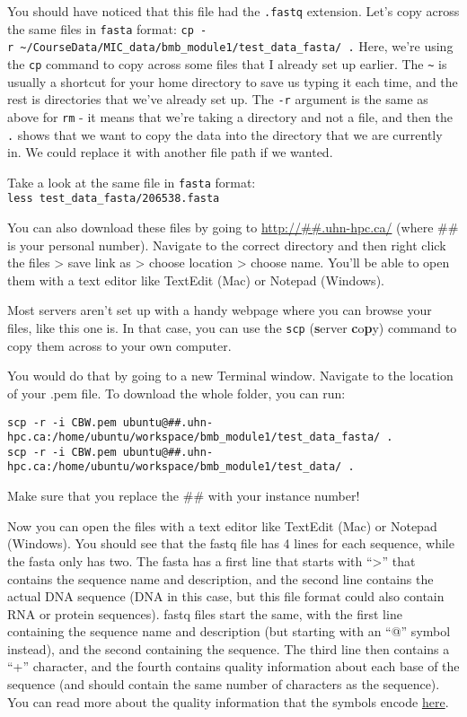 \documentclass[
]{book}
\begin{document}
You should have noticed that this file had the \texttt{.fastq} extension. Let's copy across the same files in \texttt{fasta} format: \texttt{cp\ -r\ \textasciitilde{}/CourseData/MIC\_data/bmb\_module1/test\_data\_fasta/\ .}
Here, we're using the \texttt{cp} command to copy across some files that I already set up earlier. The \texttt{\textasciitilde{}} is usually a shortcut for your home directory to save us typing it each time, and the rest is directories that we've already set up. The \texttt{-r} argument is the same as above for \texttt{rm} - it means that we're taking a directory and not a file, and then the \texttt{.} shows that we want to copy the data into the directory that we are currently in. We could replace it with another file path if we wanted.

Take a look at the same file in \texttt{fasta} format: \texttt{less\ test\_data\_fasta/206538.fasta}

You can also download these files by going to \url{http://\#\#.uhn-hpc.ca/} (where \#\# is your personal number). Navigate to the correct directory and then right click the files \textgreater{} save link as \textgreater{} choose location \textgreater{} choose name. You'll be able to open them with a text editor like TextEdit (Mac) or Notepad (Windows).

Most servers aren't set up with a handy webpage where you can browse your files, like this one is. In that case, you can use the \texttt{scp} (\textbf{s}erver \textbf{c}o\textbf{p}y) command to copy them across to your own computer.

You would do that by going to a new Terminal window. Navigate to the location of your .pem file. To download the whole folder, you can run:

\begin{verbatim}
scp -r -i CBW.pem ubuntu@##.uhn-hpc.ca:/home/ubuntu/workspace/bmb_module1/test_data_fasta/ .
scp -r -i CBW.pem ubuntu@##.uhn-hpc.ca:/home/ubuntu/workspace/bmb_module1/test_data/ .
\end{verbatim}

Make sure that you replace the \#\# with your instance number!

Now you can open the files with a text editor like TextEdit (Mac) or Notepad (Windows).
You should see that the fastq file has 4 lines for each sequence, while the fasta only has two. The fasta has a first line that starts with ``\textgreater{}'' that contains the sequence name and description, and the second line contains the actual DNA sequence (DNA in this case, but this file format could also contain RNA or protein sequences). fastq files start the same, with the first line containing the sequence name and description (but starting with an ``@'' symbol instead), and the second containing the sequence. The third line then contains a ``+'' character, and the fourth contains quality information about each base of the sequence (and should contain the same number of characters as the sequence). You can read more about the quality information that the symbols encode \href{https://en.wikipedia.org/wiki/FASTQ_format}{here}.
\end{document}
